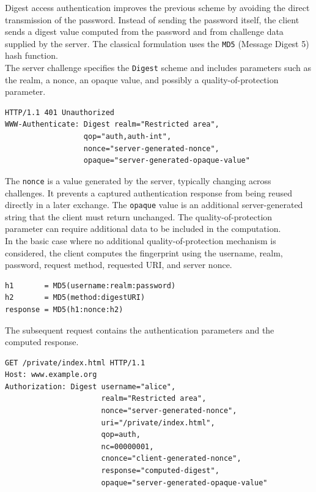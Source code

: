 \documentclass{scrbook}
\begin{document}
Digest access authentication improves the previous scheme by avoiding the direct transmission of the password. Instead of sending the password itself, the client sends a digest value computed from the password and from challenge data supplied by the server. The classical formulation uses the \texttt{MD5} (Message Digest 5) hash function.\\

The server challenge specifies the \texttt{Digest} scheme and includes parameters such as the realm, a nonce, an opaque value, and possibly a quality-of-protection parameter.

\begin{lstlisting}
HTTP/1.1 401 Unauthorized
WWW-Authenticate: Digest realm="Restricted area",
                  qop="auth,auth-int",
                  nonce="server-generated-nonce",
                  opaque="server-generated-opaque-value"
\end{lstlisting}

The \texttt{nonce} is a value generated by the server, typically changing across challenges. It prevents a captured authentication response from being reused directly in a later exchange. The \texttt{opaque} value is an additional server-generated string that the client must return unchanged. The quality-of-protection parameter can require additional data to be included in the computation.\\

In the basic case where no additional quality-of-protection mechanism is considered, the client computes the fingerprint using the username, realm, password, request method, requested URI, and server nonce.

\begin{lstlisting}
h1       = MD5(username:realm:password)
h2       = MD5(method:digestURI)
response = MD5(h1:nonce:h2)
\end{lstlisting}

The subsequent request contains the authentication parameters and the computed response.

\begin{lstlisting}
GET /private/index.html HTTP/1.1
Host: www.example.org
Authorization: Digest username="alice",
                      realm="Restricted area",
                      nonce="server-generated-nonce",
                      uri="/private/index.html",
                      qop=auth,
                      nc=00000001,
                      cnonce="client-generated-nonce",
                      response="computed-digest",
                      opaque="server-generated-opaque-value"
\end{lstlisting}
\end{document}
